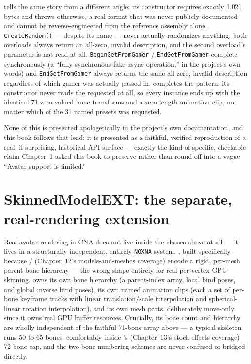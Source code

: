  tells the same story from a different angle: its constructor
requires exactly 1{,}021 bytes and throws otherwise, a real format that was never publicly
documented and cannot be reverse-engineered from the reference assembly alone.
\texttt{CreateRandom()} --- despite its name --- never actually randomizes anything; both
overloads always return an all-zero, invalid description, and the second overload's
 parameter is not read at all. \texttt{BeginGetFromGamer} /
\texttt{EndGetFromGamer} complete synchronously (a ``fully synchronous fake-async
operation,'' in the project's own words) and \texttt{EndGetFromGamer} always returns the same
all-zero, invalid description regardless of which gamer was actually passed in.
 completes the pattern: its constructor never reads the requested
 at all, so every instance ends up with the identical 71
zero-valued bone transforms and a zero-length animation clip, no matter which of the 31 named
presets was requested.

None of this is presented apologetically in the project's own documentation, and this book
follows that lead: it is presented as a faithful, verified reproduction of a real, if
surprising, historical API surface --- exactly the kind of specific, checkable claim
Chapter~1 asked this book to preserve rather than round off into a vague ``Avatar
support is limited.''

\section{SkinnedModelEXT: the separate, real-rendering extension}

Real avatar rendering in CNA does not live inside the classes above at all --- it lives in a
structurally independent, entirely \texttt{NOXNA} system, , built
specifically because  /  (Chapter~12's models-and-meshes
coverage) encode a rigid, per-mesh parent-bone hierarchy --- the wrong shape entirely for
real per-vertex GPU skinning.  owns its own bone hierarchy (a
parent-index array, local bind poses, and global inverse bind poses), its own named animation
clips (each a set of per-bone keyframe tracks with linear translation/scale interpolation and
spherical-linear rotation interpolation), and its own mesh parts, deliberately move-only since
it owns real GPU buffer resources. Crucially, its bone count and hierarchy are wholly
independent of the faithful 71-bone  array above --- a typical
 skeleton runs 50 to 65 bones, comfortably inside
's (Chapter~13's stock-effects coverage) 72-bone cap, and the
two bone-numbering schemes are never confused or bridged directly.

